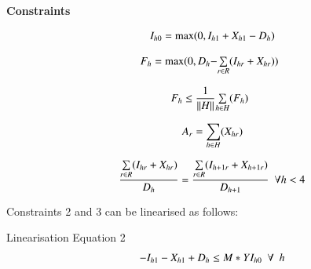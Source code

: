 \documentclass{elsarticle}
\begin{document}
	\textbf{Constraints}
	
	\begin{equation}
	\begin{array}{ll@{}ll}
	& \displaystyle I_{h0} = \max(0, I_{h1} + X_{h1} - D_{h})\\
	\end{array}
	\label{eq:Eq32}
	\end{equation}	
		
	\begin{equation}
	\begin{array}{ll@{}ll}
	& \displaystyle F_{h} = \max(0, D_{h} - &\sum\limits_{r \in R}(I_{hr} + X_{hr}))\\
	\end{array}
	\label{eq:Eq33}	
	\end{equation}
	
	\begin{equation}
	\begin{array}{ll@{}ll}
	& \displaystyle F_{h} \leq \frac{1}{\| H \|} &\sum\limits_{h \in H}(F_{h})\\
	\end{array}
	\label{eq:Eq33}	
	\end{equation}
	
	\begin{equation}
	\begin{array}{ll@{}ll}
	& \displaystyle A_{r} = \sum\limits_{h \in H}(X_{hr})\\
	\end{array}
	\label{eq:Eq33}	
	\end{equation}

	\begin{equation}
	\begin{array}{ll@{}ll}
	& \displaystyle \frac{\sum\limits_{r \in R}(I_{hr}+X_{hr})}{D_{h}} = \frac {\sum\limits_{r \in R}(I_{h+1r}+X_{h+1r})}{D_{h+1}} \ \ \forall h<4 \\
	\end{array}
	\label{eq:Eq33}	
	\end{equation}

Constraints 2 and 3 can be linearised as follows:
 

Linearisation Equation 2
  	\begin{equation}
	\begin{array}{ll@{}ll}
	& \displaystyle -I_{h1} - X_{h1} + D_{h} \leq M*YI_{h0} \ \ \forall \ \ h\\
	\end{array}
	\label{eq:Eq33}	
	\end{equation}
\end{document}
